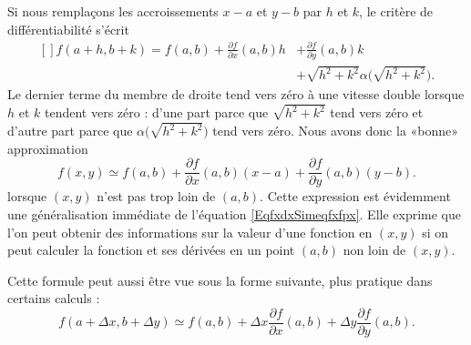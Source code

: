 Si nous remplaçons les accroissements \( x-a\) et \( y-b\) par \( h\) et \( k\), le critère de différentiabilité s'écrit
\begin{equation}
	\begin{aligned}[]
		f(a+h,b+k)=f(a,b)+\frac{ \partial f }{ \partial x }(a,b)h & +\frac{ \partial f }{ \partial y }(a,b)k         \\
		                                                          & +\sqrt{h^2+k^2}\alpha\big( \sqrt{h^2+k^2} \big).
	\end{aligned}
\end{equation}
Le dernier terme du membre de droite tend vers zéro à une vitesse double lorsque \( h\) et \( k\) tendent vers zéro : d'une part parce que \( \sqrt{h^2+k^2}\) tend vers zéro et d'autre part parce que \( \alpha\big( \sqrt{h^2+k^2} \big)\) tend vers zéro. Nous avons donc la «bonne» approximation
\begin{equation}        \label{EqFormApproxfxyab}
	f(x,y)\simeq f(a,b)+\frac{ \partial f }{ \partial x }(a,b)(x-a)+\frac{ \partial f }{ \partial y }(a,b)(y-b).
\end{equation}
lorsque \( (x,y)\) n'est pas trop loin de \( (a,b)\). Cette expression est évidemment une généralisation immédiate de l'équation \eqref{EqfxdxSimeqfxfpx}. Elle exprime que l'on peut obtenir des informations sur la valeur d'une fonction en \( (x,y)\) si on peut calculer la fonction et ses dérivées en un point \( (a,b)\) non loin de \( (x,y)\).

Cette formule peut aussi être vue sous la forme suivante, plus pratique dans certains calculs :
\begin{equation}        \label{EqFormApproxfxyabDF}
	f(a+\Delta x,b+\Delta y)\simeq f(a,b)+\Delta x\frac{ \partial f }{ \partial x }(a,b)+\Delta y\frac{ \partial f }{ \partial y }(a,b).
\end{equation}

